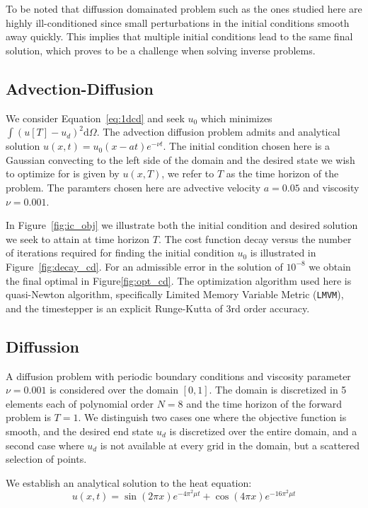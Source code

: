 \documentclass[10pt]{article}
\renewcommand{\d}{\mathrm{d}}
\begin{document}
To be noted that diffussion domainated problem such as the ones studied here are highly ill-conditioned since small perturbations in the initial conditions smooth away quickly. This implies that multiple initial conditions lead to the same final solution, which proves to be a challenge when solving inverse problems.


\subsection{Advection-Diffusion}
We consider Equation~\ref{eq:1dcd} and seek $u_0$ which minimizes $\int (u[T]-u_d)^2\d \Omega$. 
The advection diffusion problem admits and analytical solution $u(x,t)=u_0(x-at)e^{-\nu t}$. The initial condition chosen here is a Gaussian convecting to the left side of the domain and the desired state we wish to optimize for is given by $u(x,T)$, we refer to $T$ as the time horizon of the problem. The paramters chosen here are advective velocity $a=0.05$ and viscosity $\nu=0.001$.

In Figure~\ref{fig:ic_obj} we illustrate both the initial condition and desired solution we seek to attain at time horizon $T$. The cost function decay versus the number of iterations required for finding the initial condition $u_0$ is illustrated in Figure~\ref{fig:decay_cd}. For an admissible error in the solution of $10^{-8}$ we obtain the final optimal in Figure\ref{fig:opt_cd}. The optimization algorithm used here is quasi-Newton algorithm, specifically Limited Memory Variable Metric (\texttt{LMVM}), and the timestepper is an explicit Runge-Kutta of 3rd order accuracy.


\subsection{Diffussion}

A diffusion problem with periodic boundary conditions and viscosity parameter $\nu=0.001$ is considered over the domain $[0,1]$. The domain is discretized in 5 elements each of polynomial order $N=8$ and the time horizon of the forward problem is $T=1$. We distinguish two cases one where the objective function is smooth, and the desired end state $u_d$ is discretized over the entire domain, and a second case where $u_d$ is not available at every grid in the domain, but a scattered selection of points.

We establish an analytical solution to the heat equation: 
\begin{equation}
u(x,t)=\sin(2\pi x)e^{-4\pi^2\mu t}+\cos(4\pi x)e^{-16\pi^2\mu t}
\label{eq:heatex}
\end{equation}
\end{document}
